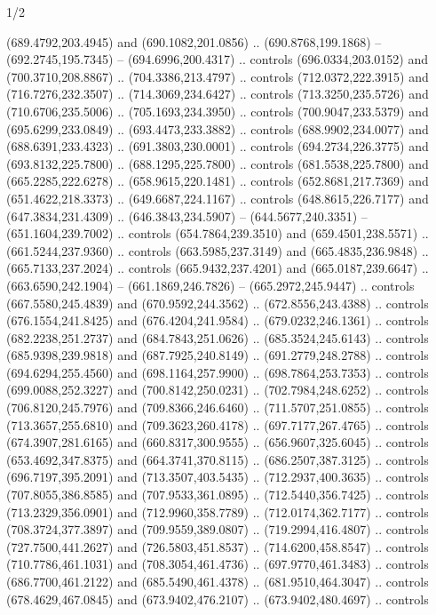 \begin{flagdescription}{1/2}
\begin{scope}[shift={(2*\flaglength/3-0.25*\rb,0.51333\flagwidth)},scale=0.001715\flagwidth*\stretchfactor]
\begin{scope}[y=-1pt, x=1pt,cm={{1.04354,0.0,0.0,1.01818,(-827,-297)}}]
\begin{scope}[draw=black,line width=0.015\flagwidth]
\begin{scope}[fill=gold]
  (689.4792,203.4945) and (690.1082,201.0856) .. (690.8768,199.1868) --
  (692.2745,195.7345) -- (694.6996,200.4317) .. controls (696.0334,203.0152) and
  (700.3710,208.8867) .. (704.3386,213.4797) .. controls (712.0372,222.3915) and
  (716.7276,232.3507) .. (714.3069,234.6427) .. controls (713.3250,235.5726) and
  (710.6706,235.5006) .. (705.1693,234.3950) .. controls (700.9047,233.5379) and
  (695.6299,233.0849) .. (693.4473,233.3882) .. controls (688.9902,234.0077) and
  (688.6391,233.4323) .. (691.3803,230.0001) .. controls (694.2734,226.3775) and
  (693.8132,225.7800) .. (688.1295,225.7800) .. controls (681.5538,225.7800) and
  (665.2285,222.6278) .. (658.9615,220.1481) .. controls (652.8681,217.7369) and
  (651.4622,218.3373) .. (649.6687,224.1167) .. controls (648.8615,226.7177) and
  (647.3834,231.4309) .. (646.3843,234.5907) -- (644.5677,240.3351) --
  (651.1604,239.7002) .. controls (654.7864,239.3510) and (659.4501,238.5571) ..
  (661.5244,237.9360) .. controls (663.5985,237.3149) and (665.4835,236.9848) ..
  (665.7133,237.2024) .. controls (665.9432,237.4201) and (665.0187,239.6647) ..
  (663.6590,242.1904) -- (661.1869,246.7826) -- (665.2972,245.9447) .. controls
  (667.5580,245.4839) and (670.9592,244.3562) .. (672.8556,243.4388) .. controls
  (676.1554,241.8425) and (676.4204,241.9584) .. (679.0232,246.1361) .. controls
  (682.2238,251.2737) and (684.7843,251.0626) .. (685.3524,245.6143) .. controls
  (685.9398,239.9818) and (687.7925,240.8149) .. (691.2779,248.2788) .. controls
  (694.6294,255.4560) and (698.1164,257.9900) .. (698.7864,253.7353) .. controls
  (699.0088,252.3227) and (700.8142,250.0231) .. (702.7984,248.6252) .. controls
  (706.8120,245.7976) and (709.8366,246.6460) .. (711.5707,251.0855) .. controls
  (713.3657,255.6810) and (709.3623,260.4178) .. (697.7177,267.4765) .. controls
  (674.3907,281.6165) and (660.8317,300.9555) .. (656.9607,325.6045) .. controls
  (653.4692,347.8375) and (664.3741,370.8115) .. (686.2507,387.3125) .. controls
  (696.7197,395.2091) and (713.3507,403.5435) .. (712.2937,400.3635) .. controls
  (707.8055,386.8585) and (707.9533,361.0895) .. (712.5440,356.7425) .. controls
  (713.2329,356.0901) and (712.9960,358.7789) .. (712.0174,362.7177) .. controls
  (708.3724,377.3897) and (709.9559,389.0807) .. (719.2994,416.4807) .. controls
  (727.7500,441.2627) and (726.5803,451.8537) .. (714.6200,458.8547) .. controls
  (710.7786,461.1031) and (708.3054,461.4736) .. (697.9770,461.3483) .. controls
  (686.7700,461.2122) and (685.5490,461.4378) .. (681.9510,464.3047) .. controls
  (678.4629,467.0845) and (673.9402,476.2107) .. (673.9402,480.4697) .. controls

\end{scope}
\end{scope}
\end{scope}
\end{scope}
\end{flagdescription}
